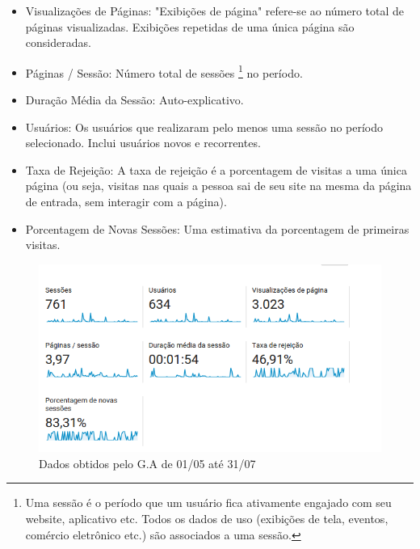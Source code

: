 \begin{itemize}
\item Visualizações de Páginas: "Exibições de página" refere-se ao número total de páginas visualizadas. Exibições repetidas de uma única página são consideradas.
\item Páginas / Sessão: Número total de sessões \footnote{Uma sessão é o período que um usuário fica ativamente engajado com seu website, aplicativo etc. Todos os dados de uso (exibições de tela, eventos, comércio eletrônico etc.) são associados a uma sessão.} no período.
\item Duração Média da Sessão: Auto-explicativo.
\item Usuários: Os usuários que realizaram pelo menos uma sessão no período selecionado. Inclui usuários novos e recorrentes.
\item Taxa de Rejeição: A taxa de rejeição é a porcentagem de visitas a uma única página (ou seja, visitas nas quais a pessoa sai de seu site na mesma da página de entrada, sem interagir com a página).
\item Porcentagem de Novas Sessões: Uma estimativa da porcentagem de primeiras visitas.

\end{itemize}

\begin{figure}[htb]
\includegraphics[width=15cm]{figuras/analytics_1interacao_dados}
\caption{\label{fig:analytics_1interacao_dados} Dados obtidos pelo G.A de 01/05 até 31/07}
\end{figure}

